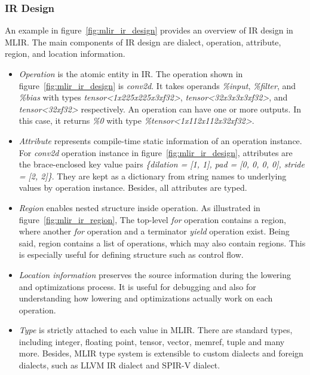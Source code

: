 \subsubsection{IR Design}
An example in figure~\ref{fig:mlir_ir_design} provides an overview of IR design in MLIR. The main components of IR design are dialect, operation, attribute, region, and location information.

\begin{itemize}
    \item \textit{Operation} is the atomic entity in IR. The operation shown in figure~\ref{fig:mlir_ir_design} is \textit{conv2d}. It takes operands \textit{\%input}, \textit{\%filter}, and \textit{\%bias} with types \textit{tensor<1x225x225x3xf32>}, \textit{tensor<32x3x3x3xf32>}, and \textit{tensor<32xf32>} respectively. An operation can have one or more outputs. In this case, it returns \textit{\%0} with type \textit{\%tensor<1x112x112x32xf32>}.
    \item \textit{Attribute} represents compile-time static information of an operation instance. For \textit{conv2d} operation instance in figure~\ref{fig:mlir_ir_design}, attributes are the brace-enclosed key value pairs \textit{\{dilation = [1, 1], pad = [0, 0, 0, 0], stride = [2, 2]\}}. They are kept as a dictionary from string names to underlying values by operation instance. Besides, all attributes are typed.
    \item \textit{Region} enables nested structure inside operation. As illustrated in figure~\ref{fig:mlir_ir_region}, The top-level \textit{for} operation contains a region, where another \textit{for} operation and a terminator \textit{yield} operation exist. Being said, region contains a list of operations, which may also contain regions. This is especially useful for defining structure such as control flow.
    \item \textit{Location information} preserves the source information during the lowering and optimizations process. It is useful for debugging and also for understanding how lowering and optimizations actually work on each operation. 
    \item \textit{Type} is strictly attached to each value in MLIR. There are standard types, including integer, floating point, tensor, vector, memref, tuple and many more. Besides, MLIR type system is extensible to custom dialects and foreign dialects, such as LLVM IR dialect and SPIR-V dialect.
\end{itemize}

